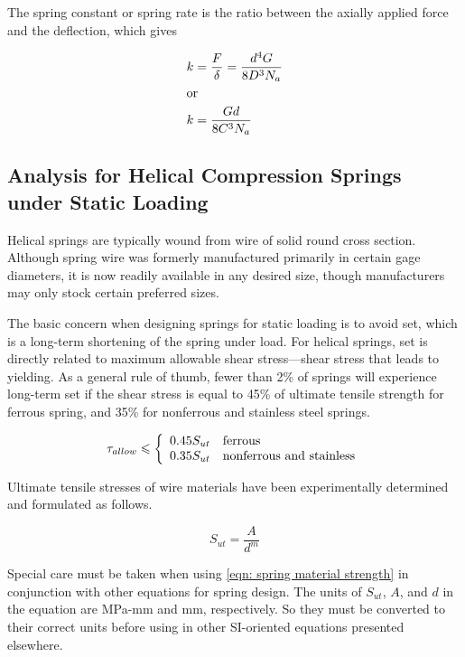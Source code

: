 \documentclass[a4paper,openany,12pt]{book}
\begin{document}
{{The spring constant or spring rate is the ratio between the axially
applied force and the deflection, which gives

\begin{gather}
\label{eqn: spring constant}
  k = \frac{F}{\delta} = \frac{d^4G}{8D^3N_a} \hfill \\
  \text{or} \hfill \\
  k = \frac{Gd}{8C^3N_a} \hfill \\ 
\end{gather}

\subsection{Analysis for Helical Compression Springs under Static Loading}
\label{analysis-for-helical-compression-springs-under-static-loading}
Helical springs are typically wound from wire of solid round cross
section. Although spring wire was formerly manufactured primarily in
certain gage diameters, it is now readily available in any desired size,
though manufacturers may only stock certain preferred sizes.

The basic concern when designing springs for static loading is to avoid
set, which is a long-term shortening of the spring under load. For
helical springs, set is directly related to maximum allowable shear
stress---shear stress that leads to yielding. As a general rule of
thumb, fewer than 2\% of springs will experience long-term set if the
shear stress is equal to 45\% of ultimate tensile strength for ferrous
spring, and 35\% for nonferrous and stainless steel springs.

$$\tau_{allow} \leqslant \left\{
    \begin{array}{ll}
       0.45 S_{ut} & \text{ferrous} \hfill \\ 
       0.35 S_{ut} & \text{nonferrous and stainless} 
     \end{array} \right.$$

Ultimate tensile stresses of wire materials have been experimentally
determined and formulated as follows.

$$S_{ut} = \frac{A}{d^m}$$

Special care must be taken when using
\ref{eqn: spring material strength} in
conjunction with other equations for spring design. The units of
\(S_{ut}\), \(A\), and \(d\) in the equation are MPa-mm and mm, respectively.
So they must be converted to their correct units before using in other
SI-oriented equations presented elsewhere.

}}
\end{document}

